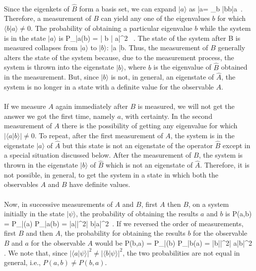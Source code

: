 \paragraph{}
Since the eigenkets of $\hat{B}$  form a basis set, we can expand $|a\rangle$ as
\be
|a\rangle = \sum_b |b\rangle \langle b|a\rangle \, .
\ee
Therefore, a measurement of $B$ can yield any one of the eigenvalues $b$ for which $\langle b |a\rangle \neq 0$.
The probability of obtaining a particular eigenvalue $b$ while the system is in the state $|a\rangle$ is
\be
P_{|a\rangle}(b) = \left | \langle b | a\rangle \right|^2 \, .
\ee
The state of the system after B is measured collapses from $|a\rangle$ to $|b\rangle$:
\be
|a\rangle\;\; \;\; |b\rangle.
\ee
Thus, the measurement of $B$ generally alters the state of the system because, due to the measurement process, the system is thrown into the eigenstate $|b\rangle$, where $b$ is the eigenvalue of  $\hat{B}$ obtained in the measurement. But, since $|b\rangle$ is not, in general, an eigenstate of $\hat{A}$, the system is no longer in a state with a definite value for the observable  $A$.

\paragraph{}
If we measure $A$ again immediately after $B$ is measured, we will not get the answer we got the first time, namely $a$, with certainty. In the second measurement of $A$ there is the possibility of getting any eigenvalue for which $\left| \langle a|b\rangle\right| \neq 0$. To repeat,  after the first measurement of $A$, the system is in the eigenstate $|a\rangle$ of
$\hat{A}$ but this state is not an eigenstate of the operator $\hat{B}$ except in a special situation discussed below. After the measurement of $B$, the system is thrown in the eigenstate $|b\rangle$ of $\hat{B}$ which is not an eigenstate of $\hat{A}$. Therefore, it is not possible, in general, to get the system in a state in which both the observables $A$ and $B$  have definite values.

\paragraph{}
Now, in successive measurements of $A$ and $B$, first $A$ then $B$, on a system initially in the state $|\psi\rangle$, the probability of obtaining the results $a$ and $b$ is
\be
P(a,b) = P_{|\psi\rangle}(a) P_{|a\rangle}(b) = \left|\langle a|\psi\rangle\right|^2\left| \langle b|a\rangle\right|^2\, .
\ee
If we reversed the order of measurements, first $B$ and then $A$,  the probability for obtaining the results
$b$ for the observable $B$ and $a$ for the observable $A$ would be
\be
P(b,a) = P_{|\psi\rangle}(b) P_{|b\rangle}(a) = \left|\langle b|\psi\rangle\right|^2\left| \langle a|b\rangle\right|^2\, .
\ee
We note that, since $\left|\langle a|\psi\rangle\right|^2\neq \left|\langle b|\psi\rangle\right|^2$, the two probabilities are not equal in general, 
i.e., $P(a,b)\neq P(b,a)$.


